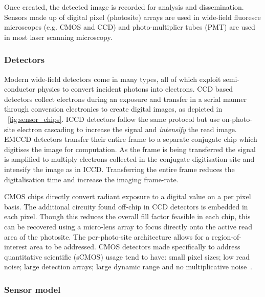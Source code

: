 Once created, the detected image is recorded for analysis and dissemination.
Sensors made up of digital \gls{pixel} (\gls{photosite}) arrays are used in \gls{wide-field} fluoresce microscopes (e.g. \gls{CMOS} and \gls{CCD}) and photo-multiplier tubes (PMT) are used in most laser scanning microscopy.

\subsubsection{Detectors}

Modern \gls{wide-field} detectors come in many types, all of which exploit semi-conductor physics to convert incident photons into electrons.
\Gls{CCD} based detectors collect electrons during an exposure and transfer in a serial manner through conversion electronics to create digital images, as depicted in \figurename~\ref{fig:sensor_chips}.
\Gls{ICCD} detectors follow the same protocol but use on-photo-site electron cascading to increase the signal and \emph{intensify} the read image.
\gls{EMCCD} detectors transfer their entire frame to a separate conjugate chip which digitises the image for computation.
As the frame is being transferred the signal is amplified to multiply electrons collected in the conjugate digitisation site and intensify the image as in \gls{ICCD}.
Transferring the entire frame reduces the digitalisation time and increase the imaging frame-rate.

\gls{CMOS} chips directly convert radiant exposure to a digital value on a per pixel basis.
The additional circuity found off-chip in \gls{CCD} detectors is embedded in each pixel.
Though this reduces the overall fill factor feasible in each chip, this can be recovered using a micro-lens array to focus directly onto the active read area of the \gls{photosite}.
The per-photo-site architecture allows for a region-of-interest area to be addressed.
\gls{CMOS} detectors made specifically to address quantitative scientific (\gls{sCMOS}) usage tend to have: small pixel sizes; low read noise; large detection arrays; large dynamic range and no multiplicative noise~\cite{verveerAdvancedFluorescenceMicroscopy2015}.


\subsubsection{Sensor model}

